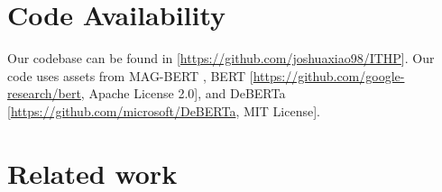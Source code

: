 \documentclass{article} %
\begin{document}

\medskip

\clearpage
{
\small
% 
%
%


}

\clearpage

\appendix


\section{Code Availability}
\label{apsec:code}
Our codebase can be found in [\href{https://github.com/joshuaxiao98/ITHP}{https://github.com/joshuaxiao98/ITHP}]. Our code uses assets from MAG-BERT \citep{rahman2020integrating}, BERT \citep{devlin2018bert} [\href{https://github.com/google-research/bert}{https://github.com/google-research/bert}, Apache License 2.0], and DeBERTa \citep{he2020deberta, he2021debertav3} [\href{https://github.com/microsoft/DeBERTa, MIT License}{https://github.com/microsoft/DeBERTa}, MIT License].


\section{Related work}
\label{apsec:related_work}
\end{document}
